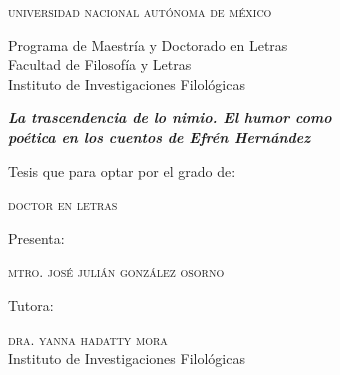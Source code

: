 \documentclass[14pt,twoside,final]{extbook} %
\begin{document}
\setcounter{page}{1}
\newpage
\pagestyle{empty}
\protect{}
{}
\BgThispage
\hspace*{0pt}
\vspace*{18pt}
\begin{center}
\large\scshape universidad nacional autónoma de méxico
\end{center}
\begin{center}
\large Programa de Maestría y Doctorado en Letras \\

Facultad de Filosofía y Letras \\

Instituto de Investigaciones Filológicas
\end{center}
\smallskip
\begin{center}
\large\itshape\bfseries La trascendencia de lo nimio. El humor como \\ poética en los cuentos de Efrén Hernández
\end{center}
\smallskip
\begin{center}
\large Tesis que para optar por el grado de:
\end{center}
\begin{center}
\large\scshape doctor en letras
\end{center}
\begin{center}
\large Presenta:
\end{center}
\begin{center}
\large\scshape mtro. josé julián gonzález osorno
\end{center}
\begin{center}
\large Tutora:
\end{center}
\begin{center}
\large\textsc{dra. yanna hadatty mora} \\

Instituto de Investigaciones Filológicas
\end{center}
\end{document}
